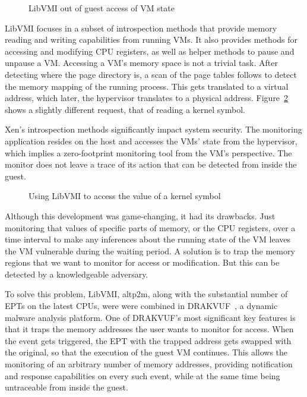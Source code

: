 \begin{figure}[ht]
	\centering
	
	\caption{LibVMI out of guest access of \ac{VM} state}
	\label{fig:libvmi}
\end{figure}

\par LibVMI focuses in a subset of introspection methods that provide memory reading and writing capabilities from running \ac{VM}s. It also provides methods for accessing and modifying \ac{CPU} registers, as well as helper methods to pause and unpause a \ac{VM}. Accessing a \ac{VM}'s memory space is not a trivial task. After detecting where the page directory is, a scan of the page tables follows to detect the memory mapping of the running process. This gets translated to a virtual address, which later, the hypervisor translates to a physical address. Figure~\ref{fig:accesskernel} shows a slightly different request, that of reading a kernel symbol.

\par Xen’s introspection methods significantly impact system security. The monitoring application resides on the host and accesses the \ac{VM}s' state from the hypervisor, which implies a zero-footprint monitoring tool from the \ac{VM}'s perspective. The monitor does not leave a trace of its action that can be detected from inside the guest.

\begin{figure}[ht]
	\centering
	
	\caption{Using LibVMI to access the value of a kernel symbol}
	\label{fig:accesskernel}
\end{figure}

\par Although this development was game-changing, it had its drawbacks. Just monitoring that values of specific parts of memory, or the \ac{CPU} registers, over a time interval to make any inferences about the running state of the \ac{VM} leaves the \ac{VM} vulnerable during the waiting period. A solution is to trap the memory regions that we want to monitor for access or modification. But this can be detected by a knowledgeable adversary. 

\par To solve this problem, LibVMI, altp2m, along with the substantial number of \ac{EPT}s on the latest \ac{CPU}s, were were combined in DRAKVUF~\cite{lengyel2014drakvuf}, a dynamic malware analysis platform. One of DRAKVUF's most significant key features is that it traps the memory addresses the user wants to monitor for access. When the event gets triggered, the \ac{EPT} with the trapped address gets swapped with the original, so that the execution of the guest \ac{VM} continues. This allows the monitoring of an arbitrary number of memory addresses, providing notification and response capabilities on every such event, while at the same time being untraceable from inside the guest.


